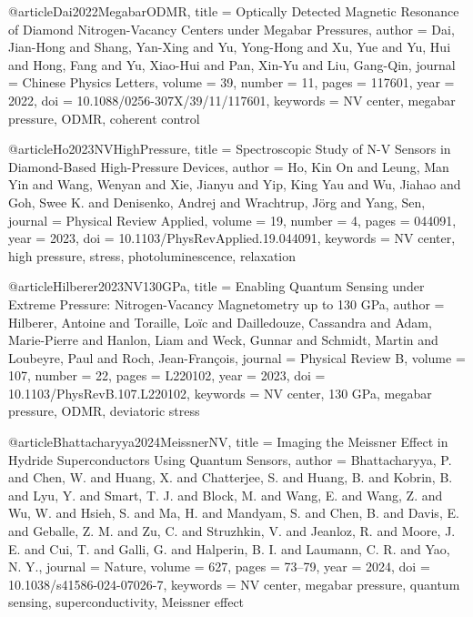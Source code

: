 @article{Dai2022MegabarODMR,
  title        = {Optically Detected Magnetic Resonance of Diamond Nitrogen-Vacancy Centers under Megabar Pressures},
  author       = {Dai, Jian-Hong and Shang, Yan-Xing and Yu, Yong-Hong and Xu, Yue and Yu, Hui and Hong, Fang and Yu, Xiao-Hui and Pan, Xin-Yu and Liu, Gang-Qin},
  journal      = {Chinese Physics Letters},
  volume       = {39},
  number       = {11},
  pages        = {117601},
  year         = {2022},
  doi          = {10.1088/0256-307X/39/11/117601},
  keywords     = {NV center, megabar pressure, ODMR, coherent control}
}

@article{Ho2023NVHighPressure,
  title        = {Spectroscopic Study of {N-V} Sensors in Diamond-Based High-Pressure Devices},
  author       = {Ho, Kin On and Leung, Man Yin and Wang, Wenyan and Xie, Jianyu and Yip, King Yau and Wu, Jiahao and Goh, Swee K. and Denisenko, Andrej and Wrachtrup, J{\"o}rg and Yang, Sen},
  journal      = {Physical Review Applied},
  volume       = {19},
  number       = {4},
  pages        = {044091},
  year         = {2023},
  doi          = {10.1103/PhysRevApplied.19.044091},
  keywords     = {NV center, high pressure, stress, photoluminescence, relaxation}
}

@article{Hilberer2023NV130GPa,
  title        = {Enabling Quantum Sensing under Extreme Pressure: Nitrogen-Vacancy Magnetometry up to 130 {GPa}},
  author       = {Hilberer, Antoine and Toraille, Lo{\"i}c and Dailledouze, Cassandra and Adam, Marie-Pierre and Hanlon, Liam and Weck, Gunnar and Schmidt, Martin and Loubeyre, Paul and Roch, Jean-Fran{\c{c}}ois},
  journal      = {Physical Review B},
  volume       = {107},
  number       = {22},
  pages        = {L220102},
  year         = {2023},
  doi          = {10.1103/PhysRevB.107.L220102},
  keywords     = {NV center, 130 GPa, megabar pressure, ODMR, deviatoric stress}
}

@article{Bhattacharyya2024MeissnerNV,
  title        = {Imaging the Meissner Effect in Hydride Superconductors Using Quantum Sensors},
  author       = {Bhattacharyya, P. and Chen, W. and Huang, X. and Chatterjee, S. and Huang, B. and Kobrin, B. and Lyu, Y. and Smart, T. J. and Block, M. and Wang, E. and Wang, Z. and Wu, W. and Hsieh, S. and Ma, H. and Mandyam, S. and Chen, B. and Davis, E. and Geballe, Z. M. and Zu, C. and Struzhkin, V. and Jeanloz, R. and Moore, J. E. and Cui, T. and Galli, G. and Halperin, B. I. and Laumann, C. R. and Yao, N. Y.},
  journal      = {Nature},
  volume       = {627},
  pages        = {73--79},
  year         = {2024},
  doi          = {10.1038/s41586-024-07026-7},
  keywords     = {NV center, megabar pressure, quantum sensing, superconductivity, Meissner effect}
}

